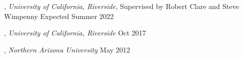 , \textit{University of California, Riverside}, Supervised by Robert Clare and Steve Wimpenny	\hfill Expected Summer 2022

, \textit{University of California, Riverside}	\hfill Oct 2017

, \textit{Northern Arizona University} \hfill	May 2012



